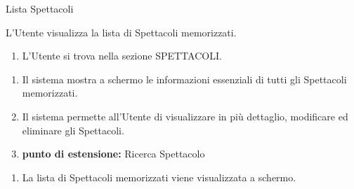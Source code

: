 {\ucTable	%
	{	%
		Lista Spettacoli
		
	}{	%
		
	}{	%
		L'Utente visualizza la lista di Spettacoli memorizzati.
		
	}{	%
		\attori
	}{	%
		\begin{enumerate}
			\item L'Utente si trova nella sezione SPETTACOLI.
		\end{enumerate}
		
	}{	%
		\begin{enumerate}
			\item Il sistema mostra a schermo le informazioni essenziali di tutti gli Spettacoli memorizzati.
            \item Il sistema permette all'Utente di visualizzare in più dettaglio, modificare ed eliminare gli Spettacoli.
            \item[] \textbf{punto di estensione:} Ricerca Spettacolo
		\end{enumerate}
		
	}{	%
		\begin{enumerate}
			\item La lista di Spettacoli memorizzati viene visualizzata a schermo.
		\end{enumerate}
		
	}{	%
} }


